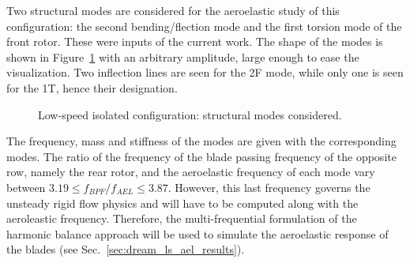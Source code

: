 Two structural modes are considered for the aeroelastic study of this 
configuration: the second bending/flection mode and the first torsion mode
of the front rotor. These were inputs of the current work.
The shape of the modes is shown in Figure~\ref{fig:dream_ls_ael_modes}
with an arbitrary amplitude, large enough to ease the visualization.
Two inflection lines are seen for the 2F mode, while only
one is seen for the 1T, hence their designation.
\begin{figure}[htp]
  \centering
  \caption{Low-speed isolated configuration: structural modes considered.}
  \label{fig:dream_ls_ael_modes}
\end{figure}
The frequency, mass and stiffness of the modes 
are given with the corresponding modes.
The ratio of the frequency of the blade passing 
frequency of the opposite row, namely the rear rotor,
and the aeroelastic frequency of
each mode vary between 
$3.19 \leq f_{BPF} / f_{AEL} \leq 3.87$. However,
this last frequency governs the unsteady rigid flow physics 
and will have to be computed along with the aeroleastic frequency.
Therefore, the multi-frequential formulation of the
harmonic balance approach will be used to simulate the
aeroelastic response of the blades (see Sec.~\ref{sec:dream_ls_ael_results}).
